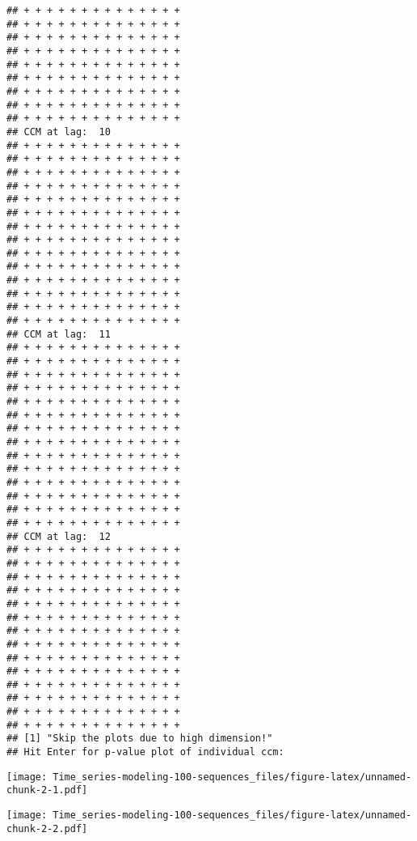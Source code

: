 \documentclass[
]{article}
\newenvironment{Shaded}{\begin{snugshade}}{\end{snugshade}}
\newcommand{\FunctionTok}[1]{\textcolor[rgb]{0.13,0.29,0.53}{\textbf{#1}}}
\newcommand{\NormalTok}[1]{#1}
\newcommand{\OtherTok}[1]{\textcolor[rgb]{0.56,0.35,0.01}{#1}}
\newcommand{\SpecialCharTok}[1]{\textcolor[rgb]{0.81,0.36,0.00}{\textbf{#1}}}
\begin{document}
\begin{verbatim}
## + + + + + + + + + + + + + + 
## + + + + + + + + + + + + + + 
## + + + + + + + + + + + + + + 
## + + + + + + + + + + + + + + 
## + + + + + + + + + + + + + + 
## + + + + + + + + + + + + + + 
## + + + + + + + + + + + + + + 
## + + + + + + + + + + + + + + 
## + + + + + + + + + + + + + + 
## CCM at lag:  10 
## + + + + + + + + + + + + + + 
## + + + + + + + + + + + + + + 
## + + + + + + + + + + + + + + 
## + + + + + + + + + + + + + + 
## + + + + + + + + + + + + + + 
## + + + + + + + + + + + + + + 
## + + + + + + + + + + + + + + 
## + + + + + + + + + + + + + + 
## + + + + + + + + + + + + + + 
## + + + + + + + + + + + + + + 
## + + + + + + + + + + + + + + 
## + + + + + + + + + + + + + + 
## + + + + + + + + + + + + + + 
## + + + + + + + + + + + + + + 
## CCM at lag:  11 
## + + + + + + + + + + + + + + 
## + + + + + + + + + + + + + + 
## + + + + + + + + + + + + + + 
## + + + + + + + + + + + + + + 
## + + + + + + + + + + + + + + 
## + + + + + + + + + + + + + + 
## + + + + + + + + + + + + + + 
## + + + + + + + + + + + + + + 
## + + + + + + + + + + + + + + 
## + + + + + + + + + + + + + + 
## + + + + + + + + + + + + + + 
## + + + + + + + + + + + + + + 
## + + + + + + + + + + + + + + 
## + + + + + + + + + + + + + + 
## CCM at lag:  12 
## + + + + + + + + + + + + + + 
## + + + + + + + + + + + + + + 
## + + + + + + + + + + + + + + 
## + + + + + + + + + + + + + + 
## + + + + + + + + + + + + + + 
## + + + + + + + + + + + + + + 
## + + + + + + + + + + + + + + 
## + + + + + + + + + + + + + + 
## + + + + + + + + + + + + + + 
## + + + + + + + + + + + + + + 
## + + + + + + + + + + + + + + 
## + + + + + + + + + + + + + + 
## + + + + + + + + + + + + + + 
## + + + + + + + + + + + + + + 
## [1] "Skip the plots due to high dimension!"
## Hit Enter for p-value plot of individual ccm:
\end{verbatim}

\texttt{[image: Time\_series-modeling-100-sequences\_files/figure-latex/unnamed-chunk-2-1.pdf]}

\begin{Shaded}
\end{Shaded}

\texttt{[image: Time\_series-modeling-100-sequences\_files/figure-latex/unnamed-chunk-2-2.pdf]}

\begin{Shaded}
\end{Shaded}
\end{document}
